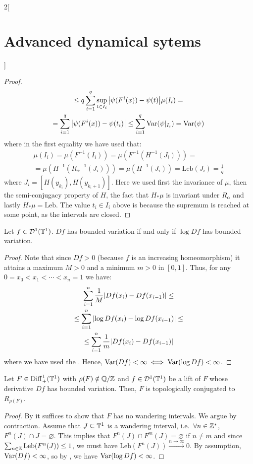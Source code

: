 \documentclass[../../../main_math.tex]{subfiles}
\begin{document}
\begin{multicols}{2}[\section{Advanced dynamical sytems}]
\begin{proof}
\begin{multline*}
      \leq q \sum_{i=1}^q \sup_{t\in I_i}\abs{\psi(F^i(x))-\psi(t)}\mu(I_i)=\\
      =\sum_{i=1}^q \abs{\psi(F^i(x))-\psi(t_i)}\leq \sum_{i=1}^q \mathrm{Var}(\psi|_{I_i})= \mathrm{Var}(\psi)
    \end{multline*}
    where in the first equality we have used that:
    \begin{multline*}
      \mu(I_i)=\mu(F^{-1}(I_i))=\mu(F^{-1}(H^{-1}(J_i)))=\\=\mu(H^{-1}({R_\alpha}^{-1}(J_i)))=\mu(H^{-1}(J_i))=\text{Leb}(J_i)=\frac{1}{q}
    \end{multline*}
    where $J_i=[H(y_{k_i}),H(y_{{k_i}+1})]$. Here we used first the invariance of $\mu$, then the semi-conjugacy property of $H$, the fact that $H_*\mu$ is invariant under $R_\alpha$ and lastly $H_*\mu = \text{Leb}$. The value $t_i\in I_i$ above is because the supremum is reached at some point, as the intervals are closed.
  \end{proof}
  \begin{lemma}\label{ADS:lema_var_log}
    Let $f\in \mathcal{D}^1(\mathbb{T}^1)$. $Df$ has bounded variation if and only if $\log Df$ has bounded variation.
  \end{lemma}
  \begin{proof}
    Note that since $Df>0$ (because $f$ is an increasing homeomorphism) it attains a maximum $M>0$ and a minimum $m>0$ in $[0,1]$. Thus, for any $0=x_0<x_1<\cdots<x_n=1$ we have:
    \begin{multline*}
      \sum_{i=1}^{n}\frac{1}{M}\abs{Df(x_{i})-Df(x_{i-1})}\leq \\\leq\sum_{i=1}^{n}\abs{\log Df(x_{i})-\log Df(x_{i-1})}\leq \\\leq \sum_{i=1}^{n}\frac{1}{m}\abs{Df(x_{i})-Df(x_{i-1})}
    \end{multline*}
    where we have used the . Hence, $\mathrm{Var}(Df)<\infty\iff \mathrm{Var}(\log Df)<\infty$.
  \end{proof}
  \begin{theorem}
    Let $F\in \mathrm{Diff}_+^1(\mathbb{T}^1)$ with $\rho(F)\notin\quot{\QQ}{\ZZ}$ and $f\in\mathcal{D}^1(\mathbb{T}^1)$ be a lift of $F$ whose derivative $Df$ has bounded variation. Then, $F$ is topologically conjugated to $R_{\rho(F)}$.
  \end{theorem}
  \begin{proof}
    By  it suffices to show that $F$ has no wandering intervals. We argue by contraction. Assume that $J\subseteq \mathbb{T}^1$ is a wandering interval, i.e.\ $\forall n\in\mathbb{Z}^*$, $F^n(J)\cap J=\varnothing$. This implies that $F^n(J) \cap F^m(J)=\varnothing$ if $n\ne m$ and since $\sum_{n\in\mathbb{Z}}\text{Leb}(F^n(J))\leq 1$, we must have $\text{Leb}(F^n(J))\overset{n\to\infty}{\longrightarrow}0$. By assumption, $\mathrm{Var}(Df)<\infty$, so by , we have $\mathrm{Var}(\log Df) < \infty$.

\end{proof}
\end{multicols}
\end{document}
